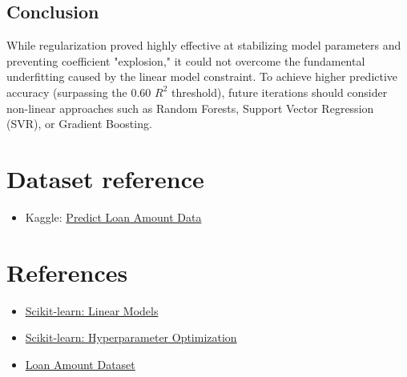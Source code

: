 \documentclass[11pt]{article}
\begin{document}
\subsection*{Conclusion} While regularization proved highly effective at stabilizing model parameters and preventing coefficient "explosion," it could not overcome the fundamental underfitting caused by the linear model constraint. To achieve higher predictive accuracy (surpassing the 0.60 $R^2$ threshold), future iterations should consider non-linear approaches such as Random Forests, Support Vector Regression (SVR), or Gradient Boosting.

\section*{Dataset reference}
\begin{itemize}
    \item Kaggle: \href{https://www.kaggle.com/datasets/phileinsophos/predict-loan-amount-data}{Predict Loan Amount Data}
\end{itemize}

\section*{References}
\begin{itemize}
    \item \href{https://scikit-learn.org/stable/modules/linear_model.html}{Scikit-learn: Linear Models}
    \item \href{https://scikit-learn.org/stable/modules/grid_search.html}{Scikit-learn: Hyperparameter Optimization}
    \item \href{https://www.kaggle.com/datasets/phileinsophos/predict-loan-amount-data}{Loan Amount Dataset}
\end{itemize}
\end{document}
